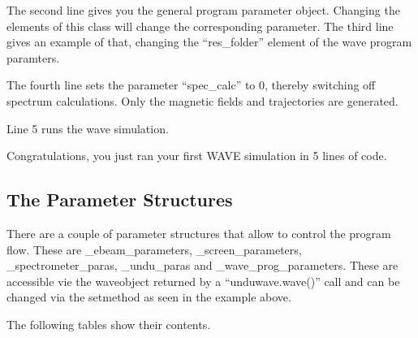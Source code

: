 \documentclass[letterpaper,10pt,english]{sphinxmanual}
\begin{document}
\begin{DUlineblock}{0em}
\item[] The second line gives you the general program parameter object. Changing the elements of this class will change the corresponding parameter. The third line gives an example of that, changing the “res\_folder” element of the wave program paramters.
\end{DUlineblock}

\begin{DUlineblock}{0em}
\item[] The fourth line sets the parameter “spec\_calc” to 0, thereby switching off spectrum calculations. Only the magnetic fields and trajectories are generated.
\end{DUlineblock}

\begin{DUlineblock}{0em}
\item[] Line 5 runs the wave simulation.
\end{DUlineblock}

\begin{DUlineblock}{0em}
\item[] Congratulations, you just ran your first WAVE simulation in 5 lines of code.
\end{DUlineblock}


\subsection{The Parameter Structures}
\label{\detokenize{quickguide:the-parameter-structures}}
\begin{DUlineblock}{0em}
\item[] There are a couple of parameter structures that allow to control the program flow. These are \_ebeam\_parameters, \_screen\_parameters, \_spectrometer\_paras, \_undu\_paras and \_wave\_prog\_parameters. These are accessible vie the wave\sphinxhyphen{}object returned by a “unduwave.wave()” call and can be changed via the set\sphinxhyphen{}method as seen in the example above.
\end{DUlineblock}

\sphinxAtStartPar
The following tables show their contents.
\end{document}
